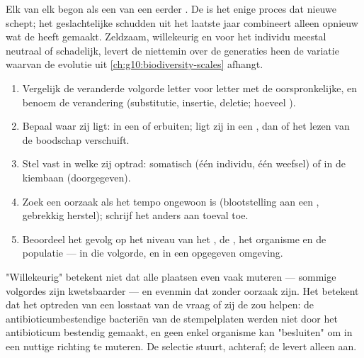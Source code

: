 \begin{proposition}\label{prop:g11:mutations:source}
Elk  van elk  begon als een  van een eerder . De
 is het enige proces dat nieuwe  schept; het
geslachtelijke schudden uit het laatste jaar combineert alleen opnieuw
wat de  heeft gemaakt. Zeldzaam, willekeurig en voor het individu
meestal neutraal of schadelijk, levert de  niettemin over de
generaties heen de variatie waarvan de evolutie uit
\cref{ch:g10:biodiversity-scales} afhangt.
\end{proposition}
\admitted

\begin{method}\label{met:g11:mutations:analyse}
\begin{enumerate}
  \item Vergelijk de veranderde volgorde letter voor letter met de
        oorspronkelijke, en benoem de verandering (substitutie,
        insertie, deletie; hoeveel ).
  \item Bepaal waar zij ligt: in een  of erbuiten; ligt zij in een
        , dan of het lezen van de boodschap verschuift.
  \item Stel vast in welke  zij optrad: somatisch (één individu, één
        weefsel) of in de kiembaan (doorgegeven).
  \item Zoek een oorzaak als het tempo ongewoon is (blootstelling aan een
        , gebrekkig herstel); schrijf het anders aan toeval toe.
  \item Beoordeel het gevolg op het niveau van het , de , het
        organisme en de populatie --- in die volgorde, en in een
        opgegeven omgeving.
\end{enumerate}
\end{method}

\begin{remark}\label{rem:g11:mutations:random}
"Willekeurig" betekent niet dat alle plaatsen even vaak muteren ---
sommige volgordes zijn kwetsbaarder --- en evenmin dat  zonder
oorzaak zijn. Het betekent dat het optreden van een  losstaat van
de vraag of zij de  zou helpen: de antibioticumbestendige bacteriën
van de stempelplaten werden niet door het antibioticum bestendig gemaakt,
en geen enkel organisme kan "besluiten" om in een nuttige richting te
muteren. De selectie stuurt, achteraf; de  levert alleen aan.
\end{remark}


